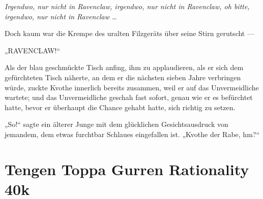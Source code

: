 \emph{Irgendwo, nur nicht in Ravenclaw, irgendwo, nur nicht in Ravenclaw, oh bitte, irgendwo, nur nicht in Ravenclaw …}

Doch kaum war die Krempe des uralten Filzgeräts über seine Stirn gerutscht —

„RAVENCLAW!“

Als der blau geschmückte Tisch anfing, ihm zu applaudieren, als er sich dem gefürchteten Tisch näherte, an dem er die nächsten sieben Jahre verbringen würde, zuckte Kvothe innerlich bereits zusammen, weil er auf das Unvermeidliche wartete; und das Unvermeidliche geschah fast sofort, genau wie er es befürchtet hatte, bevor er überhaupt die Chance gehabt hatte, sich richtig zu setzen.

„So!“ sagte ein älterer Junge mit dem glücklichen Gesichtsausdruck von jemandem, dem etwas furchtbar Schlaues eingefallen ist.
„Kvothe der Rabe, hm?“

\section{Tengen Toppa Gurren Rationality 40k}

